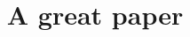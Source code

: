 \documentclass[sigplan,10pt]{acmart}
\begin{document}
\date{}

\title{A great paper}



\maketitle



%











\end{document}
